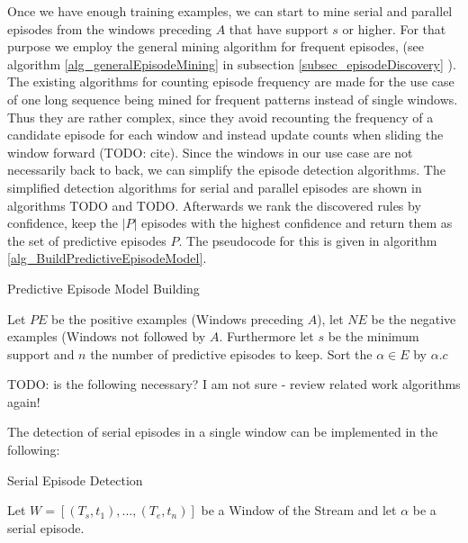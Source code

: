 Once we have enough training examples, we can start to mine serial and parallel episodes from the windows preceding $A$ that have support $s$ or higher. For that purpose we employ the general mining algorithm for frequent episodes, (see algorithm \ref{alg_generalEpisodeMining} in subsection \ref{subsec_episodeDiscovery} ). The existing algorithms for counting episode frequency are made for the use case of one long sequence being mined for frequent patterns instead of single windows. Thus they are rather complex, since they avoid recounting the frequency of a candidate episode for each window and instead update counts when sliding the window forward (TODO: cite). Since the windows in our use case are not necessarily back to back, we can simplify the episode detection algorithms. The simplified detection algorithms for serial and parallel episodes are shown in algorithms TODO and TODO. Afterwards we rank the discovered rules by confidence, keep the $|P|$ episodes with the highest confidence and return them as the set of predictive episodes $P$. The pseudocode for this is given in algorithm \ref{alg_BuildPredictiveEpisodeModel}.

\begin{algorithm}[H]
  \caption{Predictive Episode Model Building
    \label{alg_BuildPredictiveEpisodeModel}}
  \begin{algorithmic}[1]
    \Statex
    \Require Let $PE$ be the positive examples (Windows preceding $A$), let $NE$ be the negative examples (Windows not followed by $A$. Furthermore let $s$ be the minimum support and $n$ the number of predictive episodes to keep.
      \State Sort the $\alpha \in E$ by  $\alpha .c$
      \State {}
    \EndFunction
  \end{algorithmic}
\end{algorithm}

TODO: is the following necessary? I am not sure - review related work algorithms again!

The detection of serial episodes in a single window can be implemented in the following:

\begin{algorithm}[H]
  \caption{Serial Episode Detection
    \label{alg_SerialEpisodeDetection}}
  \begin{algorithmic}[1]
    \Statex
    \Require Let $W=[(T_s,t_1),...,(T_e,t_n)]$ be a Window of the Stream and let $\alpha$ be a serial episode.
        \EndIf
      \EndWhile
      \State {}
    \EndFunction
  \end{algorithmic}
\end{algorithm}

